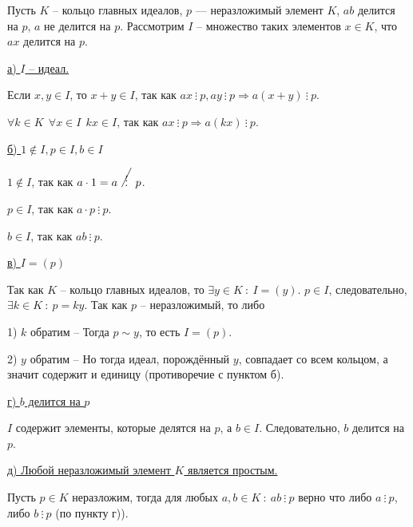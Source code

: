 Пусть $K$ -- кольцо главных идеалов, $p$ — неразложимый элемент $K$, 
$ab$ делится на $p$, $a$ не делится на $p$. 
Рассмотрим $I$ -- множество таких элементов $x \in K$, 
что $ax$ делится на $p$.

\underline{а) $I$ -- идеал.}

Если $x, y \in I$, то $x + y \in I$, так как 
$ax\ \vdots\ p, ay\ \vdots\ p \Rightarrow a (x + y)\ \vdots\ p$.

$\forall k \in K \ \ \forall x \in I \ \ kx \in I$, так как
$ax\ \vdots\ p \Rightarrow a(kx)\ \vdots\ p$.

\underline{б) $1 \not \in I, p \in I, b \in I$}

$1 \not \in I$, так как $a \cdot 1 = a\ \cancel{\ \vdots\ }\ p$.

$p \in I$, так как $a \cdot p\ \vdots\ p$.

$b \in I$, так как $ab\ \vdots\ p$.

\underline{в) $I = (p)$}

Так как $K$ -- кольцо главных идеалов, то $\exists y \in K\ :\ I = (y)$.
\newline $p \in I$, следовательно, $\exists k \in K\ :\ p = ky$.
Так как $p$ -- неразложимый, то либо

1) $k$ обратим -- Тогда $p \sim y$, то есть $I = (p)$.

2) $y$ обратим -- Но тогда идеал, порождённый $y$, совпадает со всем кольцом, а значит
содержит и единицу (противоречие с пунктом б).

\underline{г) $b$ делится на $p$}

$I$ содержит элементы, которые делятся на $p$, а $b \in I$.
Следовательно, $b$ делится на $p$.

\underline{д) Любой неразложимый элемент $K$ является простым.}

Пусть $p \in K$ неразложим, 
тогда для любых $a, b \in K\ :\ ab\ \vdots\ p$ верно что либо 
$a\ \vdots\ p$, либо $b\ \vdots\ p$ (по пункту г)).

